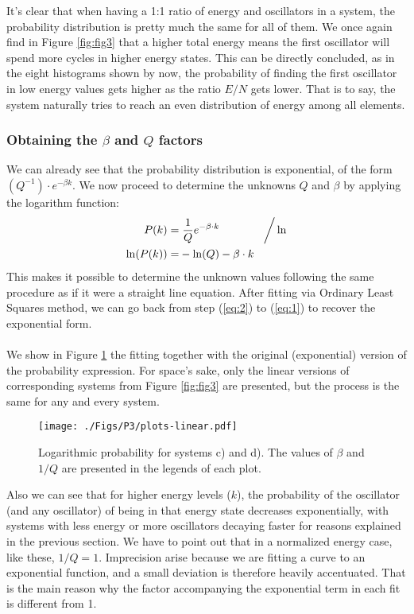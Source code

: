 \documentclass[a4paper, 12pt, notitlepage]{article}
\begin{document}
\noindent
It's clear that when having a 1:1 ratio of energy and oscillators in a system, the probability distribution is pretty much the same for all of them. We once again find in Figure \ref{fig:fig3} that a higher total energy means the first oscillator will spend more cycles in higher energy states. This can be directly concluded, as in the eight histograms shown by now, the probability of finding the first oscillator in low energy values gets higher as the ratio $E/N$ gets lower. That is to say, the system naturally tries to reach an even distribution of energy among all elements.

\subsubsection*{Obtaining the $\beta$ and $Q$ factors}
We can already see that the probability distribution is exponential, of the form $(Q^{-1})\cdot e^{-\beta k}$. We now proceed to determine the unknowns $Q$ and $\beta$ by applying the logarithm function:
\begin{align}
	P(k) =& \left.\frac{1}{Q}e^{-\beta\cdot k}\qquad\qquad\right/\ln\label{eq:1} \\
	\ln (P(k)) =& -\ln(Q) - \beta\cdot k\label{eq:2}
\end{align}
This makes it possible to determine the unknown values following the same procedure as if it were a straight line equation. After fitting via Ordinary Least Squares method, we can go back from step (\ref{eq:2}) to (\ref{eq:1}) to recover the exponential form.\\\\
We show in Figure \ref{fig:fig4} the fitting together with the original (exponential) version of the probability expression. For space's sake, only the linear versions of corresponding systems from Figure \ref{fig:fig3} are presented, but the process is the same for any and every system.
\begin{figure}[h]
	\centering
	\texttt{[image: ./Figs/P3/plots-linear.pdf]}
	\caption{Logarithmic probability for systems c) and d). The values of $\beta$ and $1/Q$ are presented in the legends of each plot.}\label{fig:fig4}
\end{figure}
Also we can see that for higher energy levels ($k$), the probability of the oscillator (and any oscillator) of being in that energy state decreases exponentially, with systems with less energy or more oscillators decaying faster for reasons explained in the previous section. We have to point out that in a normalized energy case, like these, $1/Q = 1$. Imprecision arise because we are fitting a curve to an exponential function, and a small deviation is therefore heavily accentuated. That is the main reason why the factor accompanying the exponential term in each fit is different from 1.
\end{document}
